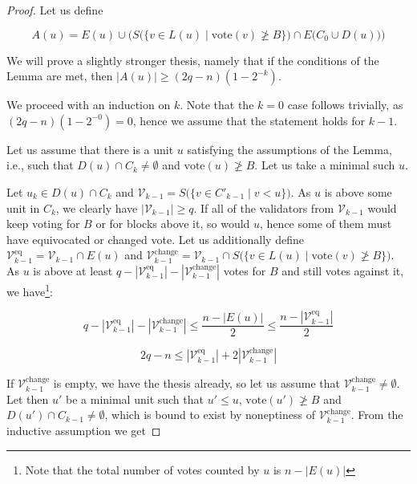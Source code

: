 \documentclass[12pt, fleqn]{article}
\newcommand{\vote}{\mathrm{vote}}
\begin{document}
\begin{proof}

Let us define 

$$A(u) = E(u)\cup \Big(S\big(\{v\in L(u) \mid \vote(v) \not\geq B\}\big) \cap E\big(C_0 \cup D(u)\big)\Big)$$

We will prove a slightly stronger thesis, namely that if the conditions of the Lemma are met, then $|A(u)| \geq (2q-n)(1-2^{-k})$.

We proceed with an induction on $k$.
Note that the $k = 0$ case follows trivially, as $(2q-n)(1-2^{-0}) = 0$, hence we assume that the statement holds for $k-1$.

Let us assume that there is a unit $u$ satisfying the assumptions of the Lemma, i.e., such that $D(u)\cap C_k\neq\emptyset$ and $\vote(u)\not\geq B$.
Let us take a minimal such $u$.

Let $u_k\in D(u)\cap C_k$ and $\mathcal{V}_{k-1} = S\big(\{v\in C'_{k-1}\mid v< u \}\big)$.
As $u$ is above some unit in $C_k$, we clearly have $| \mathcal{V}_{k-1}|\geq q$.
If all of the validators from $\mathcal{V}_{k-1}$ would keep voting for $B$ or for blocks above it, so would $u$, hence some of them must have equivocated or changed vote.
Let us additionally define $\mathcal{V}^{\mathrm{eq}}_{k-1} =\mathcal{V}_{k-1}\cap  E(u)$ and $\mathcal{V}^{\mathrm{change}}_{k-1} = \mathcal{V}_{k-1}\cap S\Big(\{v\in L(u)\mid \vote(v) \not\geq B\}\Big)$.
As $u$ is above at least $q-|\mathcal{V}^{\mathrm{eq}}_{k-1}|-|\mathcal{V}^{\mathrm{change}}_{k-1}|$ votes for $B$ and still votes against it, we have\footnote{Note that the total number of votes counted by $u$ is $n-|E(u)|$}:


\begin{equation*}
q-|\mathcal{V}^{\mathrm{eq}}_{k-1}|-|\mathcal{V}^{\mathrm{change}}_{k-1}| \leq \frac{n-|E(u)|}{2} \leq \frac{n-|\mathcal{V}^{\mathrm{eq}}_{k-1}|}{2}
\end{equation*}

\begin{equation}\label{EquationSummit1}
2q-n \leq |\mathcal{V}^{\mathrm{eq}}_{k-1}| +2|\mathcal{V}^{\mathrm{change}}_{k-1}|
\end{equation}

\noindent If $\mathcal{V}^{\mathrm{change}}_{k-1}$ is empty, we have the thesis already, so let us assume that $\mathcal{V}^{\mathrm{change}}_{k-1}\neq\emptyset$.
Let then $u'$ be a minimal unit such that $u'\leq u$, $\vote(u')\not\geq B$ and $D(u')\cap C_{k-1}\neq\emptyset$, which is bound to exist by noneptiness of $\mathcal{V}^{\mathrm{change}}_{k-1}$.
From the inductive assumption we get 


\end{proof}
\end{document}
